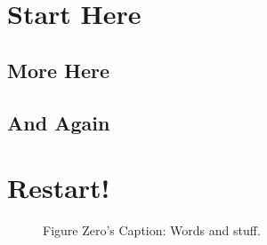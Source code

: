 \section{Start Here}

\subsection{More Here}

\subsection{And Again}

\section{Restart!}

\begin{figure}
\caption[Figure Zero]{Figure Zero's Caption: Words and stuff.}
\end{figure}
